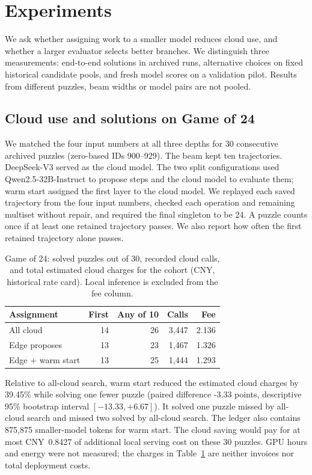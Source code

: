 \section{Experiments}
\label{sec:jt-experiments}
We ask whether assigning work to a smaller model reduces cloud use, and whether a larger evaluator selects better branches. We distinguish three measurements: end-to-end solutions in archived runs, alternative choices on fixed historical candidate pools, and fresh model scores on a validation pilot. Results from different puzzles, beam widths or model pairs are not pooled.

\subsection{Cloud use and solutions on Game of 24}
We matched the four input numbers at all three depths for 30 consecutive archived puzzles (zero-based IDs 900--929). The beam kept ten trajectories. DeepSeek-V3 served as the cloud model. The two split configurations used Qwen2.5-32B-Instruct to propose steps and the cloud model to evaluate them; warm start assigned the first layer to the cloud model. We replayed each saved trajectory from the four input numbers, checked each operation and remaining multiset without repair, and required the final singleton to be 24. A puzzle counts once if at least one retained trajectory passes. We also report how often the first retained trajectory alone passes.

\begin{table}[tb]
\centering\small
\caption{Game of 24: solved puzzles out of 30, recorded cloud calls, and total estimated cloud charges for the cohort (CNY, historical rate card). Local inference is excluded from the fee column.}
\label{tab:jt-cloud}
\setlength{\tabcolsep}{3.5pt}
\begin{tabular}{@{}lrrrr@{}}\toprule
Assignment & First & Any of 10 & Calls & Fee \\ \midrule
All cloud & 14 & 26 & 3,447 & 2.136 \\
Edge proposes & 13 & 23 & 1,467 & 1.326 \\
Edge + warm start & 13 & 25 & 1,444 & 1.293 \\
\bottomrule\end{tabular}
\end{table}

Relative to all-cloud search, warm start reduced the estimated cloud charges by 39.45\% while solving one fewer puzzle (paired difference -3.33 points, descriptive 95\% bootstrap interval $[-13.33, +6.67]$). It solved one puzzle missed by all-cloud search and missed two solved by all-cloud search. The ledger also contains 875,875 smaller-model tokens for warm start. The cloud saving would pay for at most CNY~0.8427 of additional local serving cost on these 30 puzzles. GPU hours and energy were not measured; the charges in Table~\ref{tab:jt-cloud} are neither invoices nor total deployment costs.

